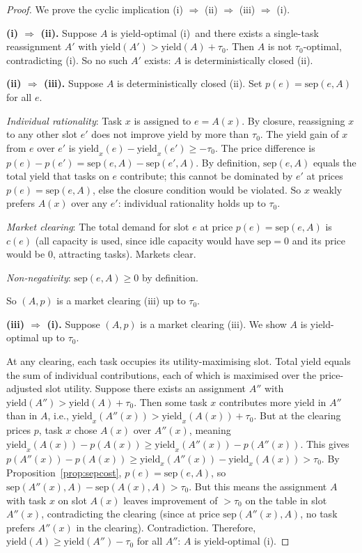 \documentclass[11pt,twocolumn,a4paper]{article}
\theoremstyle{plain}
\theoremstyle{definition}
\theoremstyle{remark}
\newcommand{\tick}{\tau_0}
\newcommand{\sep}{\mathrm{sep}}
\newcommand{\yield}{\mathrm{yield}}
\begin{document}
\begin{proof}
We prove the cyclic implication (i) $\Rightarrow$ (ii) $\Rightarrow$ (iii) $\Rightarrow$ (i).

\medskip
\noindent\textbf{(i) $\Rightarrow$ (ii).} Suppose $A$ is yield-optimal (i)\ and there exists a single-task reassignment $A'$ with $\yield(A') > \yield(A) + \tick$. Then $A$ is not $\tick$-optimal, contradicting (i). So no such $A'$ exists: $A$ is deterministically closed (ii).

\medskip
\noindent\textbf{(ii) $\Rightarrow$ (iii).} Suppose $A$ is deterministically closed (ii). Set $p(e) = \sep(e, A)$ for all $e$.

\emph{Individual rationality}: Task $x$ is assigned to $e = A(x)$. By closure, reassigning $x$ to any other slot $e'$ does not improve yield by more than $\tick$. The yield gain of $x$ from $e$ over $e'$ is $\yield_x(e) - \yield_x(e') \geq -\tick$. The price difference is $p(e) - p(e') = \sep(e, A) - \sep(e', A)$. By definition, $\sep(e, A)$ equals the total yield that tasks on $e$ contribute; this cannot be dominated by $e'$ at prices $p(e) = \sep(e, A)$, else the closure condition would be violated. So $x$ weakly prefers $A(x)$ over any $e'$: individual rationality holds up to $\tick$.

\emph{Market clearing}: The total demand for slot $e$ at price $p(e) = \sep(e, A)$ is $c(e)$ (all capacity is used, since idle capacity would have $\sep = 0$ and its price would be $0$, attracting tasks). Markets clear.

\emph{Non-negativity}: $\sep(e, A) \geq 0$ by definition.

So $(A, p)$ is a market clearing (iii) up to $\tick$.

\medskip
\noindent\textbf{(iii) $\Rightarrow$ (i).} Suppose $(A, p)$ is a market clearing (iii). We show $A$ is yield-optimal up to $\tick$.

At any clearing, each task occupies its utility-maximising slot. Total yield equals the sum of individual contributions, each of which is maximised over the price-adjusted slot utility. Suppose there exists an assignment $A''$ with $\yield(A'') > \yield(A) + \tick$. Then some task $x$ contributes more yield in $A''$ than in $A$, i.e., $\yield_x(A''(x)) > \yield_x(A(x)) + \tick$. But at the clearing prices $p$, task $x$ chose $A(x)$ over $A''(x)$, meaning $\yield_x(A(x)) - p(A(x)) \geq \yield_x(A''(x)) - p(A''(x))$. This gives $p(A''(x)) - p(A(x)) \geq \yield_x(A''(x)) - \yield_x(A(x)) > \tick$. By Proposition~\ref{prop:sepcost}, $p(e) = \sep(e, A)$, so $\sep(A''(x), A) - \sep(A(x), A) > \tick$. But this means the assignment $A$ with task $x$ on slot $A(x)$ leaves improvement of $> \tick$ on the table in slot $A''(x)$, contradicting the clearing (since at price $\sep(A''(x), A)$, no task prefers $A''(x)$ in the clearing). Contradiction. Therefore, $\yield(A) \geq \yield(A'') - \tick$ for all $A''$: $A$ is yield-optimal (i).


\end{proof}
\end{document}
